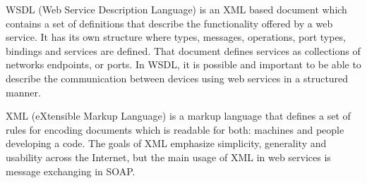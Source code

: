WSDL (Web Service Description Language) is an XML based document which contains a set of definitions that describe the functionality offered by a web service. It has its own structure where types, messages, operations, port types, bindings and services are defined. That document defines services as collections of networks endpoints, or ports. In WSDL, it is possible and important to be able to describe the communication between devices using web services in a structured manner. 

XML (eXtensible Markup Language) is a markup language that defines a set of rules for encoding documents which is readable for both: machines and people developing a code. The goals of XML emphasize simplicity, generality and usability across the Internet, but the main usage of XML in web services is message exchanging in SOAP. 

